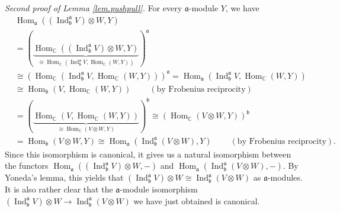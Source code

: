 \documentclass
[numbers=enddot,12pt,final,onecolumn,german,notitlepage]{scrartcl}%
\theoremstyle{definition}
\begin{document}
\textit{Second proof of Lemma \ref{lem.pushpull}.} For every $\mathfrak{a}%
$-module $Y$, we have%
\begin{align*}
&  \operatorname*{Hom}\nolimits_{\mathfrak{a}}\left(  \left(
\operatorname*{Ind}\nolimits_{\mathfrak{b}}^{\mathfrak{a}}V\right)  \otimes
W,Y\right) \\
&  =\left(  \underbrace{\operatorname*{Hom}\nolimits_{\mathbb{C}}\left(
\left(  \operatorname*{Ind}\nolimits_{\mathfrak{b}}^{\mathfrak{a}}V\right)
\otimes W,Y\right)  }_{\cong\operatorname*{Hom}\nolimits_{\mathbb{C}}\left(
\operatorname*{Ind}\nolimits_{\mathfrak{b}}^{\mathfrak{a}}%
V,\operatorname*{Hom}\nolimits_{\mathbb{C}}\left(  W,Y\right)  \right)
}\right)  ^{\mathfrak{a}}\\
&  \cong\left(  \operatorname*{Hom}\nolimits_{\mathbb{C}}\left(
\operatorname*{Ind}\nolimits_{\mathfrak{b}}^{\mathfrak{a}}%
V,\operatorname*{Hom}\nolimits_{\mathbb{C}}\left(  W,Y\right)  \right)
\right)  ^{\mathfrak{a}}=\operatorname*{Hom}\nolimits_{\mathfrak{a}}\left(
\operatorname*{Ind}\nolimits_{\mathfrak{b}}^{\mathfrak{a}}%
V,\operatorname*{Hom}\nolimits_{\mathbb{C}}\left(  W,Y\right)  \right) \\
&  \cong\operatorname*{Hom}\nolimits_{\mathfrak{b}}\left(
V,\operatorname*{Hom}\nolimits_{\mathbb{C}}\left(  W,Y\right)  \right)
\ \ \ \ \ \ \ \ \ \ \left(  \text{by Frobenius reciprocity}\right) \\
&  =\left(  \underbrace{\operatorname*{Hom}\nolimits_{\mathbb{C}}\left(
V,\operatorname*{Hom}\nolimits_{\mathbb{C}}\left(  W,Y\right)  \right)
}_{\cong\operatorname*{Hom}\nolimits_{\mathbb{C}}\left(  V\otimes W,Y\right)
}\right)  ^{\mathfrak{b}}\cong\left(  \operatorname*{Hom}\nolimits_{\mathbb{C}%
}\left(  V\otimes W,Y\right)  \right)  ^{\mathfrak{b}}\\
&  =\operatorname*{Hom}\nolimits_{\mathfrak{b}}\left(  V\otimes W,Y\right)
\cong\operatorname*{Hom}\nolimits_{\mathfrak{a}}\left(  \operatorname*{Ind}%
\nolimits_{\mathfrak{b}}^{\mathfrak{a}}\left(  V\otimes W\right)  ,Y\right)
\ \ \ \ \ \ \ \ \ \ \left(  \text{by Frobenius reciprocity}\right)  .
\end{align*}
Since this isomorphism is canonical, it gives us a natural isomorphism between
the functors $\operatorname*{Hom}\nolimits_{\mathfrak{a}}\left(  \left(
\operatorname*{Ind}\nolimits_{\mathfrak{b}}^{\mathfrak{a}}V\right)  \otimes
W,-\right)  $ and $\operatorname*{Hom}\nolimits_{\mathfrak{a}}\left(
\operatorname*{Ind}\nolimits_{\mathfrak{b}}^{\mathfrak{a}}\left(  V\otimes
W\right)  ,-\right)  $. By Yoneda's lemma, this yields that $\left(
\operatorname*{Ind}\nolimits_{\mathfrak{b}}^{\mathfrak{a}}V\right)  \otimes
W\cong\operatorname*{Ind}\nolimits_{\mathfrak{b}}^{\mathfrak{a}}\left(
V\otimes W\right)  $ as $\mathfrak{a}$-modules. It is also rather clear that
the $\mathfrak{a}$-module isomorphism $\left(  \operatorname*{Ind}%
\nolimits_{\mathfrak{b}}^{\mathfrak{a}}V\right)  \otimes W\rightarrow
\operatorname*{Ind}\nolimits_{\mathfrak{b}}^{\mathfrak{a}}\left(  V\otimes
W\right)  $ we have just obtained is canonical.
\end{document}
